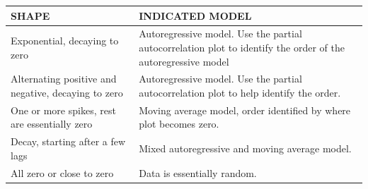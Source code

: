 \documentclass[]{book}
\begin{document}
\begin{longtable}[]{@{}ll@{}}
\toprule
\begin{minipage}[b]{0.28\columnwidth}\raggedright\strut
SHAPE\strut
\end{minipage} & \begin{minipage}[b]{0.66\columnwidth}\raggedright\strut
INDICATED MODEL\strut
\end{minipage}\tabularnewline
\midrule
\endhead
\begin{minipage}[t]{0.28\columnwidth}\raggedright\strut
Exponential, decaying to zero\strut
\end{minipage} & \begin{minipage}[t]{0.66\columnwidth}\raggedright\strut
Autoregressive model. Use the partial autocorrelation plot to identify
the order of the autoregressive model\strut
\end{minipage}\tabularnewline
\begin{minipage}[t]{0.28\columnwidth}\raggedright\strut
Alternating positive and negative, decaying to zero\strut
\end{minipage} & \begin{minipage}[t]{0.66\columnwidth}\raggedright\strut
Autoregressive model. Use the partial autocorrelation plot to help
identify the order.\strut
\end{minipage}\tabularnewline
\begin{minipage}[t]{0.28\columnwidth}\raggedright\strut
One or more spikes, rest are essentially zero\strut
\end{minipage} & \begin{minipage}[t]{0.66\columnwidth}\raggedright\strut
Moving average model, order identified by where plot becomes zero.\strut
\end{minipage}\tabularnewline
\begin{minipage}[t]{0.28\columnwidth}\raggedright\strut
Decay, starting after a few lags\strut
\end{minipage} & \begin{minipage}[t]{0.66\columnwidth}\raggedright\strut
Mixed autoregressive and moving average model.\strut
\end{minipage}\tabularnewline
\begin{minipage}[t]{0.28\columnwidth}\raggedright\strut
All zero or close to zero\strut
\end{minipage} & \begin{minipage}[t]{0.66\columnwidth}\raggedright\strut
Data is essentially random.\strut
\end{minipage}\tabularnewline

\end{longtable}
\end{document}
